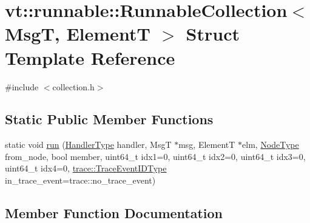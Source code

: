 \hypertarget{structvt_1_1runnable_1_1_runnable_collection}{}\section{vt\+:\+:runnable\+:\+:Runnable\+Collection$<$ MsgT, ElementT $>$ Struct Template Reference}
\label{structvt_1_1runnable_1_1_runnable_collection}


{\ttfamily \#include $<$collection.\+h$>$}

\subsection*{Static Public Member Functions}
\begin{DoxyCompactItemize}
\item 
static void \hyperlink{structvt_1_1runnable_1_1_runnable_collection_a69c0d2652d4ef9b8201518ca1305610a}{run} (\hyperlink{namespacevt_af64846b57dfcaf104da3ef6967917573}{Handler\+Type} handler, MsgT $\ast$msg, ElementT $\ast$elm, \hyperlink{namespacevt_a866da9d0efc19c0a1ce79e9e492f47e2}{Node\+Type} from\+\_\+node, bool member, uint64\+\_\+t idx1=0, uint64\+\_\+t idx2=0, uint64\+\_\+t idx3=0, uint64\+\_\+t idx4=0, \hyperlink{namespacevt_1_1trace_a64a7185f3e102df8d8258f263ccd1582}{trace\+::\+Trace\+Event\+I\+D\+Type} in\+\_\+trace\+\_\+event=trace\+::no\+\_\+trace\+\_\+event)
\end{DoxyCompactItemize}


\subsection{Member Function Documentation}
\mbox{\label{structvt_1_1runnable_1_1_runnable_collection_a69c0d2652d4ef9b8201518ca1305610a}} 
